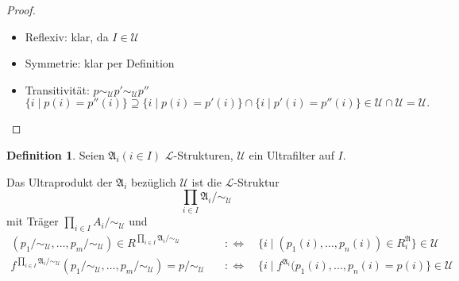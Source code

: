 \documentclass[12pt,parskip=full]{scrartcl}
\theoremstyle{definition}
\newtheorem{definition}[theorem]{Definition}
\begin{document}
	\begin{proof}
		\begin{itemize}
			\item Reflexiv: klar, da $I \in \mathcal{U}$
			\item Symmetrie: klar per Definition
			\item Transitivität: $p \sim_\mathcal{U} p' \sim_\mathcal{U} p''$
			\begin{equation*}
				\{ i \mid p(i) = p''(i) \} \supseteq \{ i \mid p(i) = p'(i) \} \cap \{ i \mid p'(i) = p''(i) \} \in \mathcal{U} \cap \mathcal{U} = \mathcal{U}.
			\end{equation*}
		\end{itemize}
	\end{proof}

	\begin{definition}
		Seien $\mathfrak{A}_i (i \in I)$ $\mathcal{L}$-Strukturen, $\mathcal{U}$ ein Ultrafilter auf $I$.
		
		Das Ultraprodukt der $\mathfrak{A}_i$ bezüglich $\mathcal{U}$ ist die $\mathcal{L}$-Struktur
		\begin{equation*}
			\prod_{i \in I} \mathfrak{A}_i / \sim_\mathcal{U}
		\end{equation*}
		mit Träger $\prod_{i \in I} A_i / \sim_\mathcal{U}$ und
		\begin{align*}
			(p_1/\sim_\mathcal{U}, \dots, p_m/\sim_\mathcal{U}) \in R^{\prod_{i \in I} \mathfrak{A}_i / \sim_\mathcal{U}} \quad&:\Leftrightarrow\quad \{ i \mid (p_1(i), \dots, p_n(i)) \in R^\mathfrak{A}_i \} \in \mathcal{U} \\f^{\prod_{i \in I} \mathfrak{A}_i / \sim_\mathcal{U}}(p_1/\sim_\mathcal{U}, \dots, p_m/\sim_\mathcal{U}) = p/\sim_\mathcal{U} \quad&:\Leftrightarrow\quad \{ i \mid f^{\mathfrak{A}_i}(p_1(i), \dots, p_n(i) = p(i) \} \in \mathcal{U}
		\end{align*}
	\end{definition}
\end{document}
